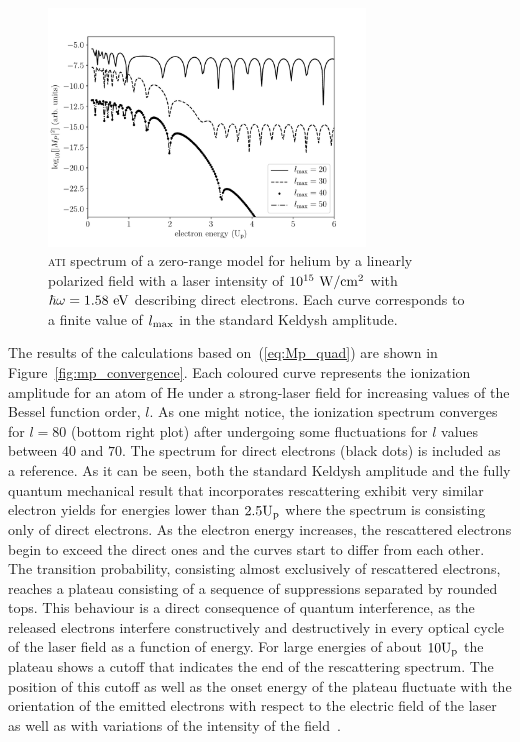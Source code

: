 \begin{figure}
  \centering
  \includegraphics[width=0.75\textwidth]{figures/ch_ATI_SFA/He/l20304050Keldysh.pdf}
\caption{\textsc{ati} spectrum of a zero-range model for helium by a
  linearly polarized field with a laser intensity of
  $10^{15}\ \rm{W/cm^{2}}$ with $\hbar\omega = 1.58\ \rm{eV}$
  describing direct electrons. Each curve corresponds to a finite
  value of $l_{\rm{max}}$ in the standard Keldysh amplitude.}
\label{fig:keldysh_convergence}
\end{figure}

The results of the calculations based on~(\ref{eq:Mp_quad}) are shown
in Figure~\ref{fig:mp_convergence}. Each coloured curve represents the
ionization amplitude for an atom of He under a strong-laser field for
increasing values of the Bessel function order, $l$. As one might
notice, the ionization spectrum converges for $l=80$ (bottom right
plot) after undergoing some fluctuations for $l$ values between $40$
and $70$. The spectrum for direct electrons (black dots) is included
as a reference. As it can be seen, both the standard Keldysh amplitude
and the fully quantum mechanical result that incorporates rescattering
exhibit very similar electron yields for energies lower than
$2.5\rm{U_{p}}$ where the spectrum is consisting only of direct
electrons. As the electron energy increases, the rescattered electrons
begin to exceed the direct ones and the curves start to differ from
each other. The transition probability, consisting almost exclusively
of rescattered electrons, reaches a plateau consisting of a sequence
of suppressions separated by rounded tops. This behaviour is a direct
consequence of quantum interference, as the released electrons
interfere constructively and destructively in every optical cycle of
the laser field as a function of energy. For large energies of about
$10\rm{U_{p}}$ the plateau shows a cutoff that indicates the end of
the rescattering spectrum. The position of this cutoff as well as the
onset energy of the plateau fluctuate with the orientation of the
emitted electrons with respect to the electric field of the laser as
well as with variations of the intensity of the
field~\cite{Kopold_1997sfa,Paulus_1994plateau,Becker_1994plateau_classical}.


